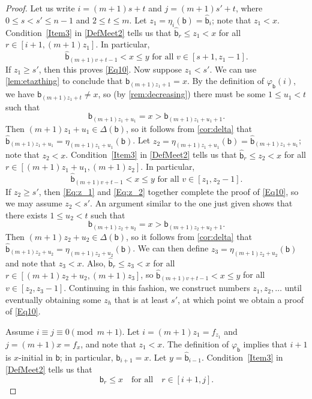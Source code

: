 \documentclass[11pt]{amsart}
\theoremstyle{definition}
\begin{document}
\begin{proof}
Let us write $i=(m+1)s+t$ and $j=(m+1)s'+t$, where $0\leq s<s'\leq n-1$ and $2\leq t\leq m$. Let $z_1=\eta_i(\mathsf b)=\widehat{\mathsf b}_i$; note that $z_1<x$. Condition~\eqref{Item3} in \cref{DefMeet2} tells us that $\widehat{\mathsf b}_r\leq z_1<x$ for all $r\in[i+1,(m+1)z_1]$. In particular, 
\begin{equation}\label{Eq:z_1}
\widehat{\mathsf b}_{(m+1)v+t-1}<x\leq y\text{ for all } v\in[s+1,z_1-1].
\end{equation} 
If $z_1\geq s'$, then this proves \eqref{Eq10}. Now suppose $z_1<s'$. We can use \cref{lem:etazthing} to conclude that $\mathsf b_{(m+1)z_1+1}=x$. By the definition of $\varphi_{\mathsf b}(i)$, we have $\mathsf b_{(m+1)z_1+t}\neq x$, so (by \cref{rem:decreasing}) there must be some $1\leq u_1<t$ such that \[{\mathsf b_{(m+1)z_1+u_1}=x>\mathsf b_{(m+1)z_1+u_1+1}}.\] Then $(m+1)z_1+u_1\in\Delta(\mathsf b)$, so it follows from \cref{cor:delta} that $\widehat{\mathsf b}_{(m+1)z_1+u_1}=\eta_{(m+1)z_1+u_1}(\mathsf b)$. Let $z_2=\eta_{(m+1)z_1+u_1}(\mathsf b)=\widehat{\mathsf b}_{(m+1)z_1+u_1}$; note that $z_2<x$. Condition~\eqref{Item3} in \cref{DefMeet2} tells us that $\widehat{\mathsf b}_r\leq z_2<x$ for all $r\in[(m+1)z_1+u_1,(m+1)z_2]$. In particular, 
\begin{equation}\label{Eq:z_2}
\widehat{\mathsf b}_{(m+1)v+t-1}<x\leq y\text{ for all }v\in[z_1,z_2-1].
\end{equation}
If $z_2\geq s'$, then \eqref{Eq:z_1} and \eqref{Eq:z_2} together complete the proof of \eqref{Eq10}, so we may assume $z_2<s'$. An argument similar to the one just given shows that there exists $1\leq u_2<t$ such that \[\mathsf b_{(m+1)z_2+u_2}=x>\mathsf b_{(m+1)z_2+u_2+1}.\] Then $(m+1)z_2+u_2\in\Delta(\mathsf b)$, so it follows from \cref{cor:delta} that $\widehat{\mathsf b}_{(m+1)z_2+u_2}=\eta_{(m+1)z_2+u_2}(\mathsf b)$. We can then define $z_3=\eta_{(m+1)z_2+u_2}(\mathsf b)$ and note that $z_3<x$. Also, $\widehat{\mathsf b}_r\leq z_3<x$ for all $r\in[(m+1)z_2+u_2,(m+1)z_3]$, so $\widehat{\mathsf b}_{(m+1)v+t-1}<x\leq y$ for all $v\in[z_2,z_3-1]$. Continuing in this fashion, we construct numbers $z_1,z_2,\ldots$ until eventually obtaining some $z_h$ that is at least $s'$, at which point we obtain a proof of \eqref{Eq10}.

\medskip

 Assume $i\equiv j\equiv 0\pmod{m+1}$. Let $i=(m+1)z_1=f_{z_1}$ and $j=(m+1)x=f_{x}$, and note that $z_1<x$. The definition of $\varphi_{\mathsf b}$ implies that $i+1$ is $x$-initial in $\mathsf b$; in particular, $\mathsf b_{i+1}=x$. Let $y=\widehat{\mathsf b}_{i-1}$. Condition~\eqref{Item3} in \cref{DefMeet2} tells us that 
\begin{equation}\label{Eq5}
\mathsf b_{r}\leq x\quad\text{for all}\quad r\in[i+1,j].
\end{equation}


\end{proof}
\end{document}
